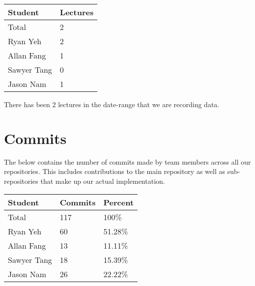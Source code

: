 \documentclass{article}
\begin{document}

\begin{table}[H]
\centering
\begin{tabular}{ll}
\toprule
\textbf{Student} & \textbf{Lectures}\\
\midrule
Total & 2\\
Ryan Yeh & 2\\
Allan Fang & 1\\
Sawyer Tang & 0\\
Jason Nam & 1\\
\bottomrule
\end{tabular}
\end{table}

There has been 2 lectures in the date-range that we are recording data.

\section{Commits}


The below contains the number of commits made by team members across all our repositories. This includes
contributions to the main repository as well as sub-repositories that make up our actual implementation.

\begin{table}[H]
\centering
\begin{tabular}{lll}
\toprule
\textbf{Student} & \textbf{Commits} & \textbf{Percent}\\
\midrule
Total & 117 & 100\% \\
Ryan Yeh & 60 & 51.28\% \\
Allan Fang & 13 & 11.11\% \\
Sawyer Tang & 18 & 15.39\% \\
Jason Nam & 26 & 22.22\% \\
\bottomrule
\end{tabular}
\end{table}
\end{document}
